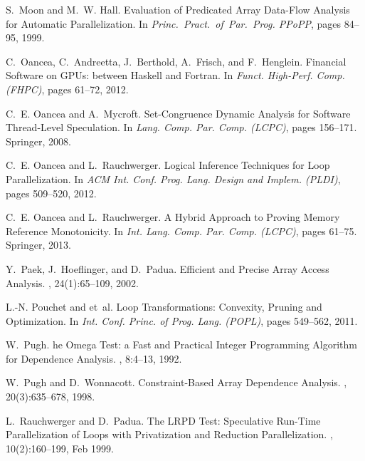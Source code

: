 \documentclass[10pt,nocopyrightspace]{sigplanconf}
\begin{document}
\begin{thebibliography}{}
S.~Moon and M.~W. Hall.
\newblock Evaluation of {P}redicated {A}rray {D}ata-{F}low {A}nalysis for
  {A}utomatic {P}arallelization.
\newblock In {\em Princ.~Pract.~of~Par.~Prog. PPoPP}, pages 84--95, 1999.

C.~Oancea, C.~Andreetta, J.~Berthold, A.~Frisch, and F.~Henglein.
\newblock Financial {S}oftware on {GPU}s: between {H}askell and {F}ortran.
\newblock In {\em Funct. High-Perf. Comp. (FHPC)}, pages 61--72, 2012.

C.~E. Oancea and A.~Mycroft.
\newblock Set-{C}ongruence {D}ynamic {A}nalysis for {S}oftware {T}hread-{L}evel
  {S}peculation.
\newblock In {\em Lang. Comp. Par. Comp. (LCPC)}, pages 156--171. Springer,
  2008.

C.~E. Oancea and L.~Rauchwerger.
\newblock Logical {I}nference {T}echniques for {L}oop {P}arallelization.
\newblock In {\em ACM Int. Conf. Prog. Lang. Design and Implem. (PLDI)}, pages
  509--520, 2012.

C.~E. Oancea and L.~Rauchwerger.
\newblock A {H}ybrid {A}pproach to {P}roving {M}emory {R}eference
  {M}onotonicity.
\newblock In {\em Int. Lang. Comp. Par. Comp. (LCPC)}, pages 61--75. Springer,
  2013.

Y.~Paek, J.~Hoeflinger, and D.~Padua.
\newblock Efficient and {P}recise {A}rray {A}ccess {A}nalysis.
,
  24(1):65--109, 2002.

L.-N. Pouchet and et~al.
\newblock Loop {T}ransformations: {C}onvexity, {P}runing and {O}ptimization.
\newblock In {\em Int. Conf. Princ. of Prog. Lang. (POPL)}, pages 549--562,
  2011.

W.~Pugh.
he {O}mega {T}est: a {F}ast and {P}ractical {I}nteger
  {P}rogramming {A}lgorithm for {D}ependence {A}nalysis.
, 8:4--13, 1992.

W.~Pugh and D.~Wonnacott.
\newblock Constraint-{B}ased {A}rray {D}ependence {A}nalysis.
, 20(3):635--678, 1998.

L.~Rauchwerger and D.~Padua.
\newblock The {LRPD} {T}est: {S}peculative {R}un-{T}ime {P}arallelization of
  {L}oops with {P}rivatization and {R}eduction {P}arallelization.
, 10(2):160--199,
  Feb 1999.


\end{thebibliography}
\end{document}
